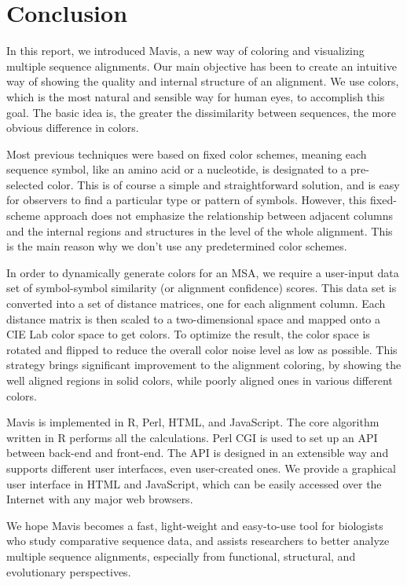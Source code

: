 \chapter{Conclusion}\label{chap:Conclusion}

In this report, we introduced Mavis, a new way of coloring and visualizing multiple sequence alignments. Our main objective has been to create an intuitive way of showing the quality and internal structure of an alignment. We use colors, which is the most natural and sensible way for human eyes, to accomplish this goal. The basic idea is, the greater the dissimilarity between sequences, the more obvious difference in colors.

Most previous techniques were based on fixed color schemes, meaning each sequence symbol, like an amino acid or a nucleotide, is designated to a pre-selected color. This is of course a simple and straightforward solution, and is easy for observers to find a particular type or pattern of symbols. However, this fixed-scheme approach does not emphasize the relationship between adjacent columns and the internal regions and structures in the level of the whole alignment. This is the main reason why we don't use any predetermined color schemes.

In order to dynamically generate colors for an MSA, we require a user-input data set of symbol-symbol similarity (or alignment confidence) scores. This data set is converted into a set of distance matrices, one for each alignment column. Each distance matrix is then scaled to a two-dimensional space and mapped onto a CIE Lab color space to get colors. To optimize the result, the color space is rotated and flipped to reduce the overall color noise level as low as possible. This strategy brings significant improvement to the alignment coloring, by showing the well aligned regions in solid colors, while poorly aligned ones in various different colors.

Mavis is implemented in R, Perl, HTML, and JavaScript. The core algorithm written in R performs all the calculations. Perl CGI is used to set up an API between back-end and front-end. The API is designed in an extensible way and supports different user interfaces, even user-created ones. We provide a graphical user interface in HTML and JavaScript, which can be easily accessed over the Internet with any major web browsers.

We hope Mavis becomes a fast, light-weight and easy-to-use tool for biologists who study comparative sequence data, and assists researchers to better analyze multiple sequence alignments, especially from functional, structural, and evolutionary perspectives.
